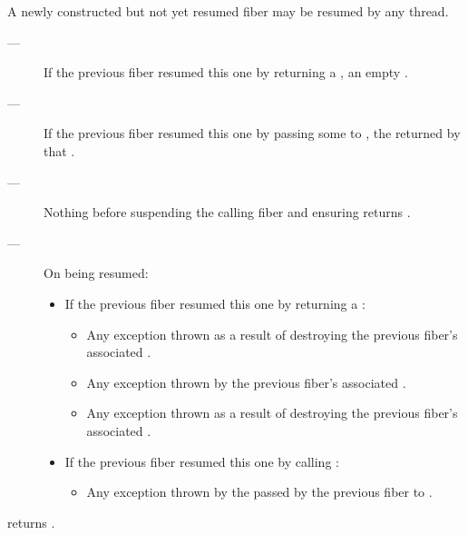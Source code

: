 \remarks
A newly constructed but not yet resumed fiber may be resumed by
any thread.

\returns
\begin{description}
    \item[---] If the previous fiber resumed this one by returning a \fiber,
               an empty \fiber.
    \item[---] If the previous fiber resumed this one by passing some 
               to \anyresumewith, the \fiber returned by that .
\end{description}

\except
\begin{description}
    \item[---] Nothing before suspending the calling fiber and
               ensuring \emptyfn returns \true.
    \item[---] On being resumed:
    \begin{itemize}
        \item If the previous fiber resumed this one by returning a \fiber:
            \begin{itemize}
                \item Any exception thrown as a result of destroying the
                      previous fiber's associated .
                \item Any exception thrown by the previous fiber's
                      associated .
                \item Any exception thrown as a result of destroying the
                      previous fiber's associated .
            \end{itemize}
        \item If the previous fiber resumed this one by calling \anyresumewith:
        \begin{itemize}
            \item Any exception thrown by the  passed by the previous
                  fiber to \anyresumewith.
        \end{itemize}
    \end{itemize}
\end{description}

\postcond
\emptyfn returns \true.

